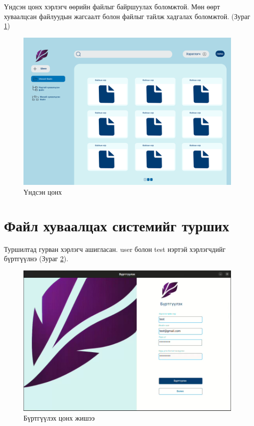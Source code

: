 \noindent Үндсэн цонх хэрлэгч өөрийн файлыг байршуулах боломжтой. Мөн өөрт хуваалцсан файлуудын жагсаалт болон файлыг тайлж хадгалах боломжтой. (Зураг \ref{fig:home})
\begin{figure}[H]
    \centering
    \includegraphics[scale=0.25]{Figures/ui/home_with_files.png}
    \caption{Үндсэн цонх}
    \label{fig:home}
\end{figure}

\section{Файл хуваалцах системийг турших}
Туршилтад гурван хэрлэгч ашигласан. user болон test нэртэй хэрлэгчдийг бүртгүүлнэ (Зураг \ref{fig:register_example}).
\begin{figure}[H]
    \centering
    \includegraphics[scale=0.3]{Figures/example/register.png}
    \caption{Бүртгүүлэх цонх жишээ}
    \label{fig:register_example}
\end{figure}

